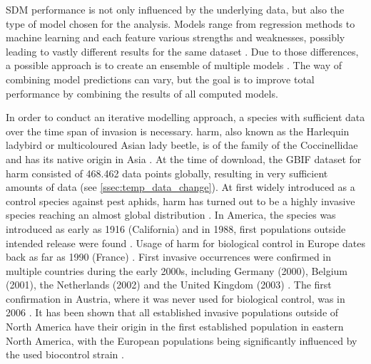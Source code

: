 \documentclass[12pt,a4paper]{article}
\begin{document}
SDM performance is not only influenced by the underlying data, but also the type of model chosen for the analysis.
Models range from regression methods to machine learning and each feature various strengths and weaknesses, possibly leading to vastly different results for the same dataset \autocite{valavi2022SDMperformance}.
Due to those differences, a possible approach is to create an ensemble of multiple models \autocite{araujo2007ensemble}.
The way of combining model predictions can vary, but the goal is to improve total performance by combining the results of all computed models.

In order to conduct an iterative modelling approach, a species with sufficient data over the time span of invasion is necessary.
\gls{harm}, also known as the Harlequin ladybird or multicoloured Asian lady beetle, is of the family of the Coccinellidae and has its native origin in Asia \autocite{roy2016harmonia}.
At the time of download, the GBIF dataset for \gls{harm} consisted of 468.462 data points globally, resulting in very sufficient amounts of data (see \ref{ssec:temp_data_change}).
At first widely introduced as a control species against pest aphids, \gls{harm} has turned out to be a highly invasive species reaching an almost global distribution \autocite{brown2008harmonia}.
In America, the species was introduced as early as 1916 (California) and in 1988, first populations outside intended release were found \autocite{chapin1991harmoniaNA}.
Usage of \gls{harm} for biological control in Europe dates back as far as 1990 (France) \autocite{coutanceau2006harmoniaFR}.
First invasive occurrences were confirmed in multiple countries during the early 2000s, including Germany (2000), Belgium (2001), the Netherlands (2002) and the United Kingdom (2003) \autocite{roy2016harmonia}.
The first confirmation in Austria, where it was never used for biological control, was in 2006 \autocite{rabitsch2006harmoniaAT}.
It has been shown that all established invasive populations outside of North America have their origin in the first established population in eastern North America, with the European populations being significantly influenced by the used biocontrol strain \autocite{lombaert2010harmoniabridgehead}.
\end{document}
